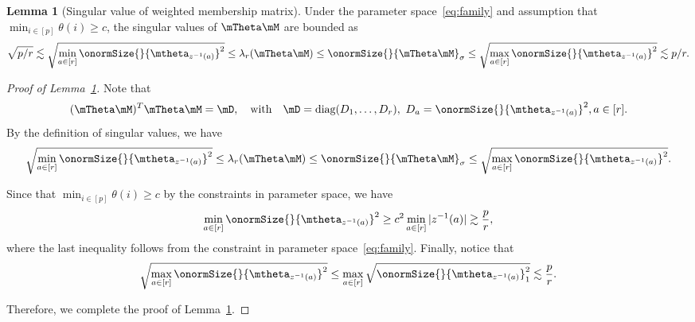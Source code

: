 \documentclass[lettersize,onecolumn,journal]{IEEEtran}
\theoremstyle{definition}
\newtheorem{lem}{Lemma}
\theoremstyle{definition}
\begin{document}


\begin{lem}[Singular value of weighted membership matrix]\label{lem:singular_thetam} Under the parameter space~\eqref{eq:family} and assumption that $\min_{i \in [p]} \theta(i) \geq c$, the singular values of $\mTheta \mM$ are bounded as 
\begin{equation}\label{eq:membership2}
     \sqrt{p/r} \lesssim \sqrt{ \min_{a \in [r]}\onormSize{}{ \mtheta_{ z^{-1}(a)} }^2 }  \leq \lambda_{r}(\mTheta \mM) \leq \onormSize{}{\mTheta \mM}_{\sigma} \leq\sqrt{ \max_{a \in [r]}\onormSize{}{ \mtheta_{ z^{-1}(a)} }^2 } \lesssim  p /r .
\end{equation}
\end{lem}

\begin{proof}[Proof of Lemma~\ref{lem:singular_thetam}] Note that 
\begin{equation}
    (\mTheta\mM)^T \mTheta \mM = \mD, \quad \text{with} \quad \mD = \text{diag}(D_1,\ldots, D_r), \ D_a = \onormSize{}{\mtheta_{z^{-1}(a)}}^2, a \in [r].
\end{equation}
By the definition of singular values, we have 
\begin{equation}
     \sqrt{\min_{a \in [r]}\onormSize{}{ \mtheta_{ z^{-1}(a)} }^2 } \leq \lambda_r(\mTheta \mM) \leq \onormSize{}{\mTheta\mM}_{\sigma} \leq \sqrt{ \max_{a \in [r]}\onormSize{}{ \mtheta_{ z^{-1}(a)} }^2}.
\end{equation}

Since that $\min_{i \in [p]}\theta(i) \geq c$ by the constraints in parameter space, we have  
\begin{equation}
   \min_{a \in [r]} \onormSize{}{ \mtheta_{ z^{-1}(a)} }^2 \geq c^2 \min_{a \in [r]} |z^{-1}(a)| \gtrsim \frac{p}{r},
\end{equation}
where the last inequality follows from the constraint in parameter space~\eqref{eq:family}. Finally, notice that 
\begin{equation}
    \sqrt{\max_{a \in [r]}\onormSize{}{ \mtheta_{ z^{-1}(a)} }^2 } \leq \max_{a \in [r]} \sqrt{ \onormSize{}{ \mtheta_{ z^{-1}(a)} }^2_1} \lesssim \frac{p}{r}.
\end{equation}

 Therefore, we complete the proof of Lemma~\ref{lem:singular_thetam}.
\end{proof}
\end{document}
